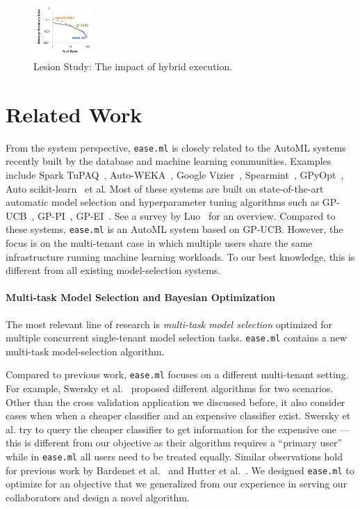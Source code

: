 \documentclass[letterpaper]{vldb}
\newcommand{\eml}{\texttt{ease.ml}\xspace}
\begin{document}
\begin{figure}[t!]
\centering
\includegraphics[width=0.2\textwidth]{figures/classifier_hybrid}
\vspace{-2em}
\caption{Lesion Study: The impact of hybrid execution.}
\label{fig:hybrid-exec}
\vspace{-1em}
\end{figure}

\section{Related Work}\label{sec:relatedwork}

\vspace{-0.5em}
From the system perspective, \eml is closely related to the
AutoML systems recently built by the database and machine learning communities.
Examples include Spark TuPAQ~\cite{XXX}, Auto-WEKA~\cite{XXX}, 
Google Vizier~\cite{XXX}, Spearmint~\cite{XXX}, GPyOpt~\cite{XXX},
Auto scikit-learn~\cite{XXX} et al. Most of these systems
are built on state-of-the-art automatic model selection and 
hyperparameter tuning algorithms such as GP-UCB~\cite{SrinivasKKS10},
GP-PI~\cite{Kushner1964}, GP-EI~\cite{SnoekLA12}.
See a survey by Luo~\cite{Luo16} for an overview.
Compared to these systems, \eml is an AutoML system based on GP-UCB. However, the focus is
on the multi-tenant case in which multiple users share the same
infrastructure running machine learning workloads. To our best knowledge,
this is different from all existing model-selection systems.

\vspace{-1em}
\paragraph*{Multi-task Model Selection and Bayesian Optimization} 
The most relevant line of research is {\em multi-task model selection}
optimized for multiple concurrent single-tenant model selection tasks.
\eml contains a new multi-task model-selection algorithm. 

Compared to previous work, \eml focuses
on a different multi-tenant setting. For example, Swersky et al.~\cite{XXX}
proposed different algorithms for two scenarios. 
Other than the cross validation application we discussed before,
it also consider cases when
when a cheaper classifier and an expensive classifier exist.
Swersky et al.
try to query the cheaper classifier to get information
for the expensive one --- this is different from our objective
as their algorithm requires a ``primary user'' while in \eml
all users need to be treated equally. Similar observations
hold for previous work by Bardenet et al.~\cite{XXX} and Hutter et al.~\cite{XXX}.
We designed \eml to optimize for an objective
that we generalized from our experience in serving our collaborators
and design a novel algorithm. 
\end{document}
